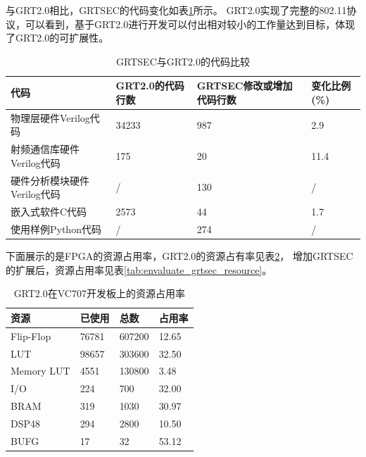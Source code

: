     与GRT2.0相比，GRTSEC的代码变化如表\ref{tab:envaluate_code_comparation}所示。
    GRT2.0实现了完整的802.11协议，可以看到，基于GRT2.0进行开发可以付出相对较小的工作量达到目标，体现了GRT2.0的可扩展性。
      \begin{table}[!hbp]
      \centering
      \caption{GRTSEC与GRT2.0的代码比较}
      \label{tab:envaluate_code_comparation}
        \begin{tabular}{|l|p{}|p{}|l|} \hline
        代码 & GRT2.0的代码行数 & GRTSEC修改或增加代码行数 & 变化比例(\%)\\ \hline
        物理层硬件Verilog代码 & 34233 & 987 & 2.9 \\ \hline
        射频通信库硬件Verilog代码 & 175 & 20 & 11.4 \\ \hline
        硬件分析模块硬件Verilog代码 & / & 130 & / \\ \hline
        嵌入式软件C代码 & 2573 & 44 & 1.7 \\ \hline
        使用样例Python代码 & / & 274 & / \\ \hline
        \end{tabular}
      \end{table}

    下面展示的是FPGA的资源占用率，GRT2.0的资源占有率见表\ref{tab:envaluate_grt2.0_resource}，
    增加GRTSEC的扩展后，资源占用率见表\ref{tab:envaluate_grtsec_resource}。
      \begin{table}[!hbp]
      \centering
      \caption{GRT2.0在VC707开发板上的资源占用率}
      \label{tab:envaluate_grt2.0_resource}
        \begin{tabular}{|l|l|l|l|} \hline
        资源 & 已使用 & 总数 & 占用率 \\ \hline
        Flip-Flop & 76781 & 607200 & 12.65 \\ \hline
        LUT & 98657 & 303600 & 32.50 \\ \hline
        Memory LUT & 4551 & 130800 & 3.48 \\ \hline
        I/O & 224 & 700 & 32.00 \\ \hline
        BRAM & 319 & 1030 & 30.97 \\ \hline
        DSP48 & 294 & 2800 & 10.50 \\ \hline
        BUFG & 17 & 32 & 53.12 \\ \hline
        \end{tabular}
      \end{table}

